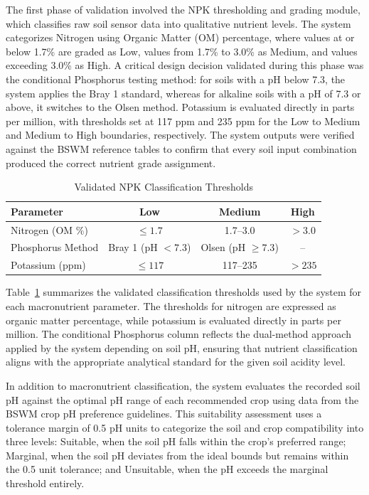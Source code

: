 {	The first phase of validation involved the NPK thresholding and grading module, which classifies raw soil sensor data into qualitative nutrient levels. The system categorizes Nitrogen using Organic Matter (OM) percentage, where values at or below 1.7\% are graded as Low, values from 1.7\% to 3.0\% as Medium, and values exceeding 3.0\% as High. A critical design decision validated during this phase was the conditional Phosphorus testing method: for soils with a pH below 7.3, the system applies the Bray 1 standard, whereas for alkaline soils with a pH of 7.3 or above, it switches to the Olsen method. Potassium is evaluated directly in parts per million, with thresholds set at 117 ppm and 235 ppm for the Low to Medium and Medium to High boundaries, respectively. The system outputs were verified against the BSWM reference tables to confirm that every soil input combination produced the correct nutrient grade assignment.
	
	\begin{table}[H]
		\centering
		\caption{Validated NPK Classification Thresholds}
		\label{tab:npk_thresholds}
		\renewcommand{\arraystretch}{1.2}
		\begin{tabular}{lccc}
			\toprule
			\textbf{Parameter} & \textbf{Low} & \textbf{Medium} & \textbf{High} \\
			\midrule
			Nitrogen (OM \%) & $\leq 1.7$ & 1.7--3.0 & $>3.0$ \\
			Phosphorus Method & Bray 1 (pH $<7.3$) & Olsen (pH $\geq7.3$) & -- \\
			Potassium (ppm) & $\leq117$ & 117--235 & $>235$ \\
			\bottomrule
		\end{tabular}
	\end{table}
	
	Table~\ref{tab:npk_thresholds} summarizes the validated classification thresholds used by the system for each macronutrient parameter. The thresholds for nitrogen are expressed as organic matter percentage, while potassium is evaluated directly in parts per million. The conditional Phosphorus column reflects the dual-method approach applied by the system depending on soil pH, ensuring that nutrient classification aligns with the appropriate analytical standard for the given soil acidity level.
	
	In addition to macronutrient classification, the system evaluates the recorded soil pH against the optimal pH range of each recommended crop using data from the BSWM crop pH preference guidelines. This suitability assessment uses a tolerance margin of 0.5 pH units to categorize the soil and crop compatibility into three levels: Suitable, when the soil pH falls within the crop's preferred range; Marginal, when the soil pH deviates from the ideal bounds but remains within the 0.5 unit tolerance; and Unsuitable, when the pH exceeds the marginal threshold entirely.
	
}
